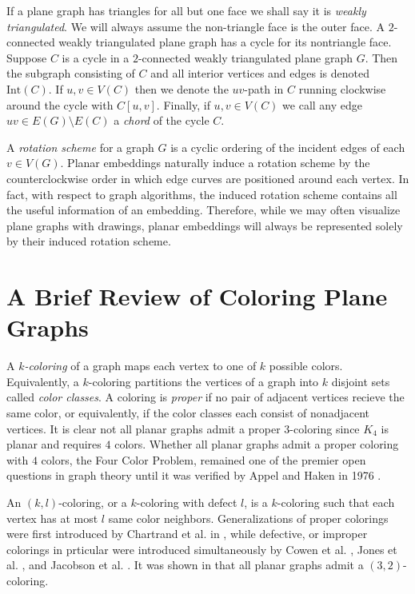 \documentclass[letterpaper, 12pt]{amsart}
\theoremstyle{definition}
\theoremstyle{definition}
\theoremstyle{thm}
\theoremstyle{definition}
\begin{document}
If a plane graph has triangles for all but one face we shall say it is
\textit{weakly triangulated}. We will always assume the non-triangle face is the
outer face. A $2$-connected weakly triangulated plane graph has a cycle for its
nontriangle face. Suppose $C$ is a cycle in a $2$-connected weakly
triangulated plane graph $G$. Then the subgraph consisting of $C$ and all interior
vertices and edges is denoted $\text{Int}(C)$. If $u,v \in V(C)$ then we denote the $uv$-path in $C$ running
clockwise around the cycle with $C[u,v]$. Finally, if $u,v\in V(C)$ we call any
edge $uv \in E(G)\setminus E(C)$ a \textit{chord} of the cycle $C$.

A \textit{rotation scheme} for a graph $G$ is a cyclic ordering of the incident
edges of each $v\in V(G)$. Planar embeddings naturally induce a rotation
scheme by the counterclockwise order in which edge curves are positioned around
each vertex. In fact, with respect to graph algorithms, the induced rotation
scheme contains all the useful information of an embedding. Therefore, while we
may often visualize plane
graphs with drawings, planar embeddings will always be represented solely by
their induced rotation scheme.

\section{A Brief Review of Coloring Plane Graphs}

A $k$\textit{-coloring} of a graph maps each vertex to one of $k$ possible
colors. Equivalently, a $k$-coloring partitions the vertices of a graph into $k$
disjoint sets called \textit{color classes}. 
A coloring is \textit{proper} if no pair of adjacent vertices recieve the same
color, or equivalently, if the color classes each consist of nonadjacent vertices. It
is clear not all planar graphs admit a proper $3$-coloring since $K_4$ is planar
and requires $4$ colors. Whether all planar graphs admit a proper coloring with
$4$ colors, the Four Color Problem, remained one of the premier open questions
in graph theory until it was verified by Appel and Haken in 1976
\cite{appel1, appel2}.

An $(k,l)$-coloring, or a $k$-coloring with defect $l$, is a
$k$-coloring such that each vertex has at most $l$ same color neighbors.
Generalizations of proper colorings were first introduced by Chartrand et al. in
\cite{chartrand}, while defective, or improper colorings in prticular were introduced
simultaneously by Cowen et al. \cite{cowen}, Jones et al. \cite{jones}, and
Jacobson et al. \cite{jacobson}. It was shown in \cite{cowen} that all
planar graphs admit a $(3,2)$-coloring.
\end{document}
